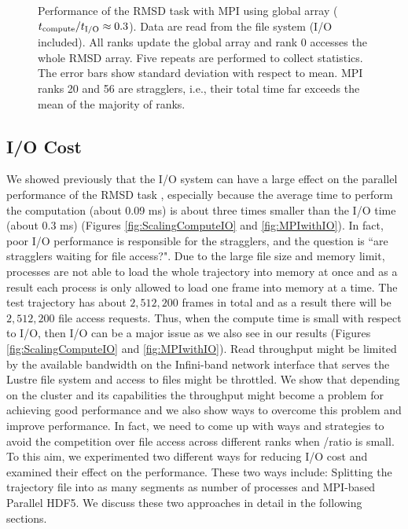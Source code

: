 \begin{figure}[ht!]
\caption{Performance of the RMSD task with MPI using global array (${t}_{\text{compute}}/{t}_{\text{I/O}} \approx 0.3$).
Data are read from the file system (I/O included). All ranks update the global array and rank 0 accesses the whole RMSD array.
Five repeats are performed to collect statistics. The error bars show standard deviation with respect to mean. 
MPI ranks 20 and 56 are stragglers, i.e., their total time far exceeds the mean of the majority of ranks.}
\label{fig:MPIwithIO-ga4py}
\end{figure}

\subsection{I/O Cost}
\label{I/O}
We showed previously that the I/O system can have a large effect on the parallel performance of the RMSD task \cite{Khoshlessan:2017ab},
especially because the average time to perform the computation \tcomp (about 0.09 ms) is about three times smaller than the I/O time \tIO (about 0.3 ms) (Figures \ref{fig:ScalingComputeIO} and \ref{fig:MPIwithIO}). 
In fact, poor I/O performance is responsible for the stragglers, and the question is ``are stragglers waiting for file access?". 
Due to the large file size and memory limit, processes are not able to load the whole trajectory into memory at once and as a result each process is only allowed to load one frame into memory at a time.
The test trajectory has about $2,512,200$ frames in total and as a result there will be $2,512,200$ file access requests. 
Thus, when the compute time is small with respect to I/O, then I/O can be a major issue as we also see in our results (Figures \ref{fig:ScalingComputeIO} and \ref{fig:MPIwithIO}).    
Read throughput might be limited by the available bandwidth on the Infini-band network interface that serves the Lustre file system and access to files might be throttled.
We show that depending on the cluster and its capabilities the throughput might become a problem for achieving good performance and we also show ways to overcome this problem and improve performance.
In fact, we need to come up with ways and strategies to avoid the competition over file access across different ranks when \tcomp/\tIO ratio is small.
To this aim, we experimented two different ways for reducing I/O cost and examined their effect on the performance.
These two ways include: Splitting the trajectory file into as many segments as number of processes and MPI-based Parallel HDF5.
We discuss these two approaches in detail in the following sections.

